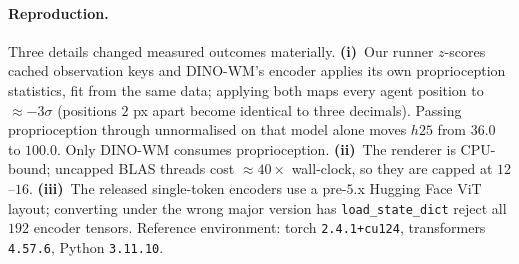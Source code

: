 \paragraph{Reproduction.}
Three details changed measured outcomes materially. \textbf{(i)}~Our runner
$z$-scores cached observation keys and DINO-WM's encoder applies its own
proprioception statistics, fit from the same data; applying both maps every
agent position to ${\approx}{-}3\sigma$ (positions $2$ px apart become
identical to three decimals). Passing proprioception through unnormalised on
that model alone moves $h25$ from $36.0$ to $100.0$. Only DINO-WM consumes
proprioception. \textbf{(ii)}~The renderer is CPU-bound; uncapped BLAS
threads cost ${\approx}40\times$ wall-clock, so they are capped at
$12$--$16$. \textbf{(iii)}~The released single-token encoders use a
pre-$5$.x Hugging Face ViT layout; converting under the wrong major version
has \texttt{load\_state\_dict} reject all $192$ encoder tensors. Reference
environment: torch \texttt{2.4.1+cu124}, transformers \texttt{4.57.6},
Python \texttt{3.11.10}.
